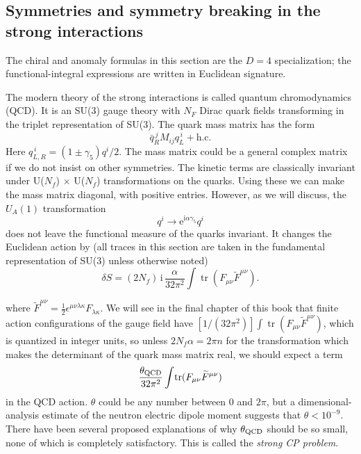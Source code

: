 \subsection{Symmetries and symmetry breaking in the strong interactions}

The chiral and anomaly formulas in this section are the $D=4$ specialization;
the functional-integral expressions are written in Euclidean signature.

The modern theory of the strong interactions is called quantum chromodynamics
(QCD). It is an SU(3) gauge theory with $N_F$ Dirac quark fields transforming
in the triplet representation of SU(3). The quark mass matrix has the form
\begin{equation}
  \bar q_R^{\,j}M_{ij}q_L^{\,i}+\text{h.c.}
  \label{eq:8.5}
\end{equation}
Here $q_{L,R}^{\,i}=(1\pm\gamma_5)q^i/2$. The mass matrix could be a general
complex matrix if we do not insist on other symmetries. The kinetic terms are
classically invariant under U($N_f$) $\times$ U($N_f$) transformations on the
quarks. Using these we can make the mass matrix diagonal, with positive
entries. However, as we will discuss, the $U_A(1)$ transformation
\[
  q^i\longrightarrow \mathrm{e}^{\mathrm{i}\alpha\gamma_5}q^i
\]
does not leave the functional measure of the quarks invariant. It changes the
Euclidean action by (all traces in this section are taken in the fundamental
representation of SU(3) unless otherwise noted)
\[
  \delta S=(2N_f)\,\mathrm{i}\,\frac{\alpha}{32\pi^2}
  \int\!\operatorname{tr}(F_{\mu\nu}\widetilde F^{\mu\nu}) .
\]

where $\widetilde F^{\mu\nu}=\tfrac12\epsilon^{\mu\nu\lambda\kappa}
F_{\lambda\kappa}$. We will see in the final chapter of this book that finite
action configurations of the gauge field have
$[1/(32\pi^2)]\int\operatorname{tr}(F_{\mu\nu}\widetilde F^{\mu\nu})$, which is
quantized in integer units, so unless $2N_f\alpha=2\pi n$ for the
transformation which makes the determinant of the quark mass matrix real, we
should expect a term
\[
  \frac{\theta_{\rm QCD}}{32\pi^2}
  \int\!\operatorname{tr}(F_{\mu\nu}\widetilde F^{\mu\nu})
\]
in the QCD action. $\theta$ could be any number between 0 and $2\pi$, but a
dimensional-analysis estimate of the neutron electric dipole moment suggests
that $\theta<10^{-9}$. There have been several proposed explanations of why
$\theta_{\rm QCD}$ should be so small, none of which is completely
satisfactory. This is called the \emph{strong CP problem}.

